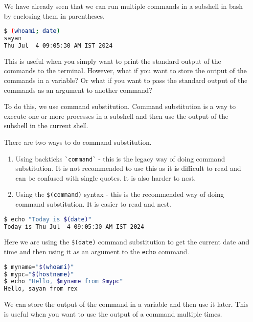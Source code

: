 We have already seen that we can run multiple commands in a subshell
in bash by enclosing them in parentheses.

\begin{lstlisting}[language=bash]
$ (whoami; date)
sayan
Thu Jul  4 09:05:30 AM IST 2024
\end{lstlisting}

This is useful when you simply want to print the standard output of the
commands to the terminal. However, what if you want to store the output
of the commands in a variable? Or what if you want to pass the standard
output of the commands as an argument to another command?

To do this, we use command substitution. Command substitution is a way
to execute one or more processes in a subshell and then use the output
of the subshell in the current shell.

There are two ways to do command substitution.

\begin{enumerate}
  \item Using backticks \lstinline|`command`| - this is the legacy way
    of doing command substitution. It is not recommended to use this
    as it is difficult to read and can be confused with single quotes.
    It is also harder to nest.
  \item Using the \lstinline|$(command)| syntax - this is the recommended
    way of doing command substitution. It is easier to read and nest.
\end{enumerate}


\begin{lstlisting}[language=bash]
$ echo "Today is $(date)"
Today is Thu Jul  4 09:05:30 AM IST 2024
\end{lstlisting}

Here we are using the \lstinline|$(date)| command substitution to get
the current date and time and then using it as an argument to the
\lstinline|echo| command.

\begin{lstlisting}[language=bash]
$ myname="$(whoami)"
$ mypc="$(hostname)"
$ echo "Hello, $myname from $mypc"
Hello, sayan from rex
\end{lstlisting}

We can store the output of the command in a variable and then use
it later. This is useful when you want to use the output of a command
multiple times.


